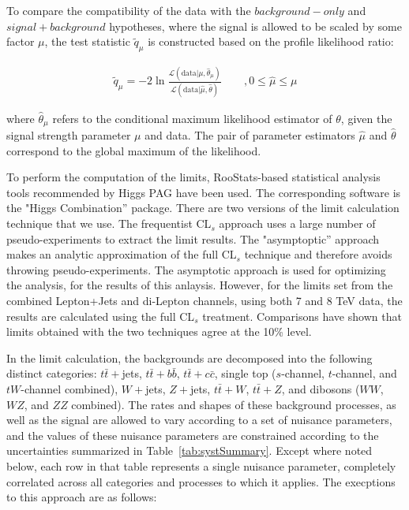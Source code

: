 \par To compare the compatibility of the data with the
$background-only$ and $signal+background$ hypotheses, where the signal
is allowed to be scaled by some factor $\mu$, the test statistic
$\tilde{q}_{\mu}$ is constructed based on the profile likelihood
ratio: 

\begin{eqnarray}
\tilde{q}_{\mu} =  -2 \ln \frac{\mathcal{L}(\mathrm{data}|\mu,\hat{\theta}_{\mu})}{\mathcal{L}(\mathrm{data}|\hat{\mu},\hat{\theta})} & \quad \ , 0 \le \hat{\mu} \le \mu 
\end{eqnarray}

\noindent where $\hat{\theta}_{\mu}$ refers to the conditional maximum
likelihood estimator of $\theta$, given the signal strength parameter
$\mu$ and data. The pair of parameter estimators $\hat{\mu}$ and
$\hat{\theta}$ correspond to the global maximum of the likelihood.

\par To perform the computation of the limits, RooStats-based
statistical analysis tools recommended by Higgs PAG have been
used. The corresponding software is the  "Higgs Combination''
package.  There are two versions of the limit calculation technique
that we use.  The frequentist CL$_s$ approach uses a large number of
pseudo-experiments to extract the limit results.  The "asymptoptic''
approach makes an analytic approximation of the full CL$_s$ technique
and therefore avoids throwing pseudo-experiments.  The
asymptotic approach is used for optimizing the analysis, for the
results of this anlaysis.  However, for the limits set from the
combined Lepton+Jets and di-Lepton channels, using both 7 and 8 TeV
data, the results are calculated using the full CL$_s$ treatment.
Comparisons have shown that limits obtained with the two techniques
agree at the 10\% level.  

\par In the limit calculation, the backgrounds are decomposed into the
following distinct categories: $t\bar{t}+$jets, $t\bar{t}+b\bar{b}$,
$t\bar{t}+c\bar{c}$, single top ($s$-channel, $t$-channel, and
$tW$-channel combined), $W+$jets, $Z+$jets, $t\bar{t}+W$,
$t\bar{t}+Z$, and dibosons ($WW$, $WZ$, and $ZZ$ combined).  The rates
and shapes of these background processes, as well as the signal are
allowed to vary according to a set of nuisance parameters, and the
values of these nuisance parameters are constrained according to the
uncertainties summarized in Table~\ref{tab:systSummary}.  Except where
noted below, each row in that table represents a single nuisance
parameter, completely correlated across all categories and processes
to which it applies.  The execptions to this approach are as follows: 

